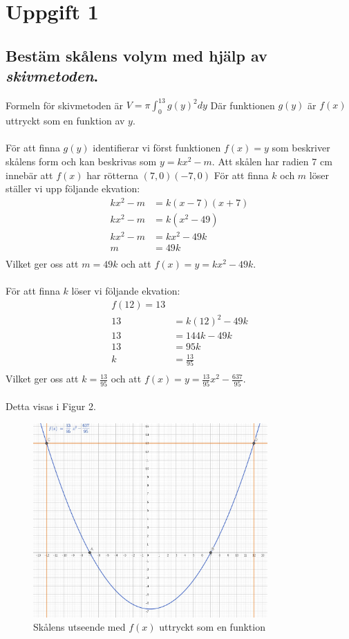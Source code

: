 \documentclass[12pt]{article}
\begin{document}
\section{Uppgift 1}
\subsection*{Bestäm skålens volym med hjälp av {\it skivmetoden}.}

Formeln för skivmetoden är $V=\pi\int_{0}^{13}{g(y)}^2dy$
Där funktionen $g(y)$ är $f(x)$ uttryckt som en funktion av $y$.
\\\\
För att finna $g(y)$ identifierar vi först funktionen $f(x)=y$ som beskriver skålens form och kan beskrivas som $y=kx^2-m$. Att skålen har radien 7 cm innebär att $f(x)$ har rötterna $(7,0) (-7,0)$
För att finna $k$ och $m$ löser ställer vi upp följande ekvation:\\
\begin{align*}
    kx^2-m&=k(x-7)(x+7)\\
    kx^2-m&=k(x^2-49)\\
    kx^2-m&=kx^2-49k\\
    m&=49k\\
\end{align*}
Vilket ger oss att $m=49k$ och att $f(x)=y=kx^2-49k$.
\\\\
För att finna $k$ löser vi följande ekvation:
\begin{align*}
    f(12)=13\\
    13&=k{(12)}^2-49k\\
    13&=144k-49k\\
    13&=95k\\
    k&=\frac{13}{95}\\
\end{align*}
Vilket ger oss att $k=\frac{13}{95}$ och att $f(x)=y=\frac{13}{95}x^2-\frac{637}{95}$.
\\\\
Detta visas i Figur 2.

\begin{figure}[h]
    \centering
    \includegraphics[width=0.8\textwidth]{figur2.jpg}
    \caption{Skålens utseende med $f(x)$ uttryckt som en funktion}
\end{figure}
\end{document}

